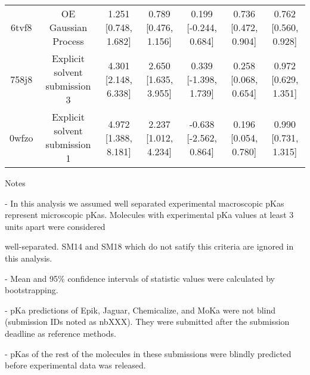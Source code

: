 \documentclass{article}
\begin{document}
\begin{center}
\begin{longtable}{|ccccccc|}
 6tvf8 &                                OE Gaussian Process &  1.251 [0.748, 1.682] &  0.789 [0.476, 1.156] &   0.199 [-0.244, 0.684] &  0.736 [0.472, 0.904] &  0.762 [0.560, 0.928] \\
 758j8 &                      Explicit solvent submission 3 &  4.301 [2.148, 6.338] &  2.650 [1.635, 3.955] &   0.339 [-1.398, 1.739] &  0.258 [0.068, 0.654] &  0.972 [0.629, 1.351] \\
 0wfzo &                      Explicit solvent submission 1 &  4.972 [1.388, 8.181] &  2.237 [1.012, 4.234] &  -0.638 [-2.562, 0.864] &  0.196 [0.054, 0.780] &  0.990 [0.731, 1.315] \\
\end{longtable}
\end{center}

Notes

- In this analysis we assumed well separated experimental macroscopic pKas represent microscopic pKas. Molecules with experimental pKa values at least 3 units apart were considered

well-separated. SM14 and SM18 which do not satify this criteria are ignored in this analysis.

- Mean and 95\% confidence intervals of statistic values were calculated by bootstrapping.

- pKa predictions of Epik, Jaguar, Chemicalize, and MoKa were not blind (submission IDs noted as nbXXX). They were submitted after the submission deadline as reference methods.

- pKas of the rest of the molecules in these submissions were blindly predicted before experimental data was released.
\end{document}
